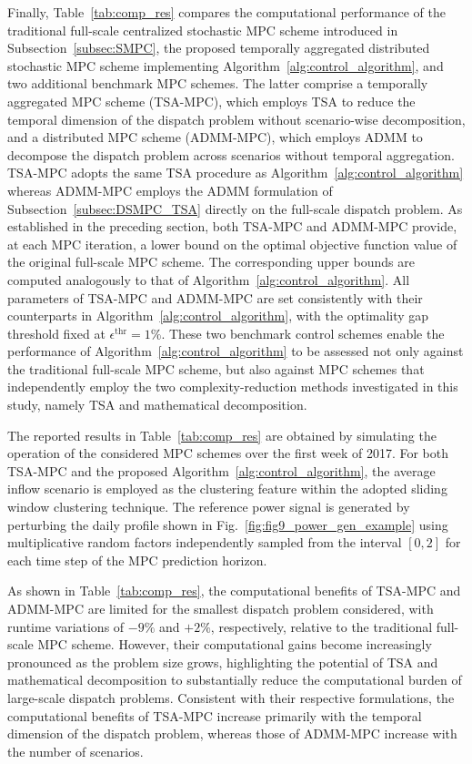\documentclass[a4paper,fleqn]{cas-sc}
\begin{document}
Finally, Table~\ref{tab:comp_res} compares the computational performance of the traditional full-scale centralized stochastic MPC scheme introduced in Subsection~\ref{subsec:SMPC},
the proposed temporally aggregated distributed stochastic MPC scheme implementing Algorithm~\ref{alg:control_algorithm},
and two additional benchmark MPC schemes.
The latter comprise a temporally aggregated MPC scheme (TSA-MPC), which employs TSA to reduce the temporal dimension of the dispatch problem without scenario-wise decomposition,
and a distributed MPC scheme (ADMM-MPC), which employs ADMM to decompose the dispatch problem across scenarios without temporal aggregation.
TSA-MPC adopts the same TSA procedure as Algorithm~\ref{alg:control_algorithm} whereas ADMM-MPC employs the ADMM formulation of Subsection~\ref{subsec:DSMPC_TSA} directly on the full-scale dispatch problem.
As established in the preceding section, both TSA-MPC and ADMM-MPC provide, at each MPC iteration, a lower bound on the optimal objective function value of the original full-scale MPC scheme.
The corresponding upper bounds are computed analogously to that of Algorithm~\ref{alg:control_algorithm}.
All parameters of TSA-MPC and ADMM-MPC are set consistently with their counterparts in Algorithm~\ref{alg:control_algorithm},
with the optimality gap threshold fixed at $\epsilon^{\mathrm{thr}}=1\%$.
These two benchmark control schemes enable the performance of Algorithm~\ref{alg:control_algorithm} to be assessed not only against the traditional full-scale MPC scheme,
but also against MPC schemes that independently employ the two complexity-reduction methods investigated in this study, namely TSA and mathematical decomposition.

The reported results in Table~\ref{tab:comp_res} are obtained by simulating the operation of the considered MPC schemes over the first week of 2017. 
For both TSA-MPC and the proposed Algorithm~\ref{alg:control_algorithm},
the average inflow scenario is employed as the clustering feature within the adopted sliding window clustering technique.
The reference power signal is generated by perturbing the daily profile shown in Fig.~\ref{fig:fig9_power_gen_example} 
using multiplicative random factors independently sampled from the interval $[0,2]$ for each time step of the MPC prediction horizon.

As shown in Table~\ref{tab:comp_res}, the computational benefits of TSA-MPC and ADMM-MPC are limited for the smallest dispatch problem considered,
with runtime variations of $-9\%$ and $+2\%$, respectively, relative to the traditional full-scale MPC scheme.
However, their computational gains become increasingly pronounced as the problem size grows,
highlighting the potential of TSA and mathematical decomposition to substantially reduce the computational burden of large-scale dispatch problems.
Consistent with their respective formulations, the computational benefits of TSA-MPC increase primarily with the temporal dimension of the dispatch problem,
whereas those of ADMM-MPC increase with the number of scenarios.
\end{document}
